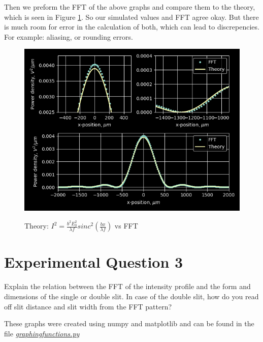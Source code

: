 \documentclass{article}
\begin{document}
Then we preform the FFT of the above graphs and compare them to the theory, which is seen in Figure \ref{attempt}. So our simulated values and FFT agree okay. But there is much room for error in the calculation of both, which can lead to discrepencies. For example: aliasing, or rounding errors.
\begin{figure}[h]
  \caption{Theory: $I^2 = \frac{b^2 E_0^2}{\lambda f} sinc^2(\frac{ bx}{\lambda f})$ vs FFT }
  \centering
  \includegraphics[scale=0.6]{thoeryvsnum.png}
  \label{attempt}
\end{figure}

\section{Experimental Question 3}
Explain the relation between the FFT of the intensity profile and the form and dimensions of the single or double slit. In case of the double slit, how do you read off slit distance and slit width from the FFT pattern?

These graphs were created using numpy and matplotlib and can be found in the file \href{https://github.com/fusionby2030/Numerical_Methods/tree/master/Labs/017E/graphingfunctions.py}{\textit{graphingfunctions.py}}
\end{document}
